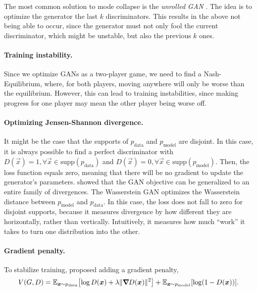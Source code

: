The most common solution to mode collapse is the \textit{unrolled GAN} \citep{metz2017unrolled}.
The idea is to optimize the generator \wrt the last $k$ discriminators. This results in the above
not being able to occur, since the generator must not only fool the current discriminator, which
might be unstable, but also the previous $k$ ones.

\paragraph{Training instability.}

Since we optimize GANs as a two-player game, we need to find a Nash-Equilibrium, where, for both
players, moving anywhere will only be worse than the equilibrium. However, this can lead to
training instabilities, since making progress for one player may mean the other player being worse
off.

\paragraph{Optimizing Jensen-Shannon divergence.}

It might be the case that the supports of $p_{\mathrm{data}}$ and $p_{\mathrm{model}}$ are
disjoint. In this case, it is always possible to find a perfect discriminator with $D(\vec{x}) = 1,
    \forall \vec{x} \in \mathrm{supp}(p_{\mathrm{data}})$ and $D(\vec{x}) = 0, \forall \vec{x} \in
    \mathrm{supp}(p_{\mathrm{model}})$. Then, the loss function equals zero, meaning that there will be
no gradient to update the generator's parameters. \cite{nowozin2016f}
showed that the GAN objective can be generalized to an entire family of divergences. The
Wasserstein GAN \citep{arjovsky2017wasserstein} optimizes the Wasserstein distance between
$p_{\mathrm{model}}$ and $p_{\mathrm{data}}$. In this case, the loss does not fall to zero for
disjoint supports, because it measures divergence by how different they are horizontally, rather
than vertically. Intuitively, it measures how much ``work'' it takes to turn one distribution into
the other.

\paragraph{Gradient penalty.}

To stabilize training, \cite{mescheder2018training} proposed adding a gradient penalty, \[
    V(G, D) = \E_{\vec{x} \sim p_{\mathrm{data}}} \lft[ \log D(\vec{x}) + \lambda \| \grad{D(\vec{x})}{} \|^2 \rgt] + \E_{\vec{x} \sim p_{\mathrm{model}}}[ \log(1 - D(\vec{x})) ].
\]

